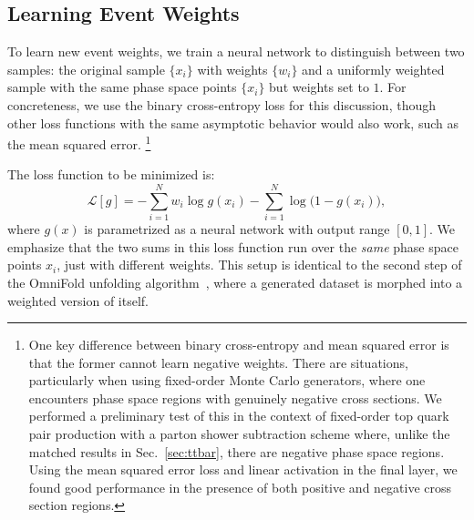 \documentclass[prd,twocolumn,superscriptaddress,longbibliography,preprintnumbers,floatfix,nofootinbib]{revtex4-1}
\DeclareRobustCommand{\Sec}[1]{Sec.~\ref{sec:#1}}
\newcommand{\OmniFold}{{\sc OmniFold}\xspace}
\begin{document}
\subsection{Learning Event Weights}
\label{sec:learn_weight}

To learn new event weights, we train a neural network to distinguish between two samples: the original sample $\{x_i\}$ with weights $\{w_i\}$ and a uniformly weighted sample with the same phase space points $\{x_i\}$ but weights set to $1$.
%
For concreteness, we use the binary cross-entropy loss for this discussion, though other loss functions with the same asymptotic behavior would also work, such as the mean squared error.%
%
\footnote{\label{footnote:mse}One key difference between binary cross-entropy and mean squared error is that the former cannot learn negative weights.
%
There are situations, particularly when using fixed-order Monte Carlo generators, where one encounters phase space regions with genuinely negative cross sections.
%
We performed a preliminary test of this in the context of fixed-order top quark pair production with a parton shower subtraction scheme where, unlike the matched results in \Sec{ttbar}, there are negative phase space regions.
%
Using the mean squared error loss and linear activation in the final layer, we found good performance in the presence of both positive and negative cross section regions.}


The loss function to be minimized is:
%
\begin{equation}
\label{eq:loss}
\mathcal{L}[g] = -\sum_{i= 1}^N w_i \log g(x_i) -\sum_{i=1}^N \log\big(1-g(x_i)\big),
\end{equation}
%
where $g(x)$ is parametrized as a neural network with output range $[0,1]$.
%
We emphasize that the two sums in this loss function run over the \emph{same} phase space points $x_i$, just with different weights.
%
This setup is identical to the second step of the \OmniFold unfolding algorithm~\cite{Andreassen:2019cjw}, where a generated dataset is morphed into a weighted version of itself.
\end{document}
